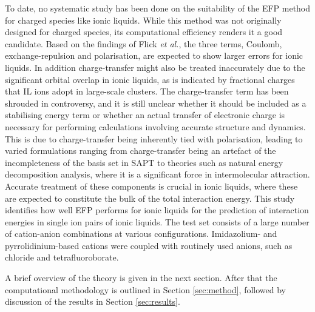 To date, no systematic study has been done on the suitability of the EFP method for charged species like ionic liquids. 
While this method was not originally designed for charged species, its computational efficiency renders it a good candidate. 
Based on the findings of Flick \emph{et al.}, 
\cite{Flick2012a}
the three terms, Coulomb, exchange-repulsion and polarisation, are expected to show larger errors for ionic liquids. 
In addition charge-transfer might also be treated inaccurately due to the significant orbital overlap in ionic liquids, as is indicated by fractional charges that IL ions adopt in large-scale clusters.
\cite{Schmidt2010a, Dommert2012a, Dommert2014a, Rigby2013a, Wendler2012a}
The charge-transfer term has been shrouded in controversy, and it is still unclear whether it should be included as a stabilising energy term or whether an actual transfer of electronic charge is necessary for performing calculations involving accurate structure and dynamics.
\cite{Ramesh2008a, Robertson2002a, Thompson2000a, Lee2011a, Piquemal2006a, Kumar2011a}
This is due to charge-transfer being inherently tied with polarisation, leading to varied formulations ranging from charge-transfer being an artefact of the incompleteness of the basis set in SAPT to theories such as natural energy decomposition analysis,
\cite{Schenter1996a, Glendening2005a}
where it is a significant force in intermolecular attraction.
Accurate treatment of these components is crucial in ionic liquids, where these are expected to constitute the bulk of the total interaction energy.
This study identifies how well EFP performs for ionic liquids for the prediction of interaction energies in single ion pairs of ionic liquids.
The test set consists of a large number of cation-anion combinations at various configurations.
Imidazolium- and pyrrolidinium-based cations were coupled with routinely used anions, such as chloride and tetrafluoroborate.


A brief overview of the theory is given in the next section. 
After that the computational methodology is outlined in Section \ref{sec:method}, followed by discussion of the results in Section \ref{sec:results}.
